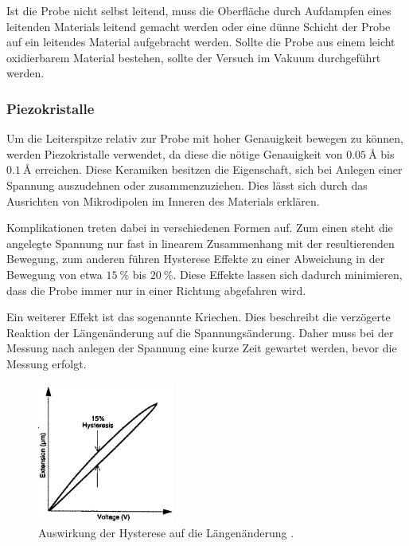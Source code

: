 Ist die Probe nicht selbst leitend, muss die Oberfläche durch Aufdampfen eines leitenden Materials leitend gemacht werden oder eine dünne Schicht der Probe auf ein leitendes Material aufgebracht werden.
Sollte die Probe aus einem leicht oxidierbarem Material bestehen, sollte der Versuch im Vakuum durchgeführt werden.

\subsubsection{Piezokristalle} %
\label{ssub:piezokristalle}

Um die Leiterspitze relativ zur Probe mit hoher Genauigkeit bewegen zu können, werden Piezokristalle verwendet, da diese die nötige Genauigkeit von $\SI{0,05}{\angstrom}$ bis $\SI{0,1}{\angstrom}$ erreichen.
Diese Keramiken besitzen die Eigenschaft, sich bei Anlegen einer Spannung auszudehnen oder zusammenzuziehen.
Dies lässt sich durch das Ausrichten von Mikrodipolen im Inneren des Materials erklären.

Komplikationen treten dabei in verschiedenen Formen auf.
Zum einen steht die angelegte Spannung nur fast in linearem Zusammenhang mit der resultierenden Bewegung, zum anderen führen Hysterese Effekte zu einer Abweichung in der Bewegung von etwa $\SI{15}{\percent}$ bis $\SI{20}{\percent}$.
Diese Effekte lassen sich dadurch minimieren, dass die Probe immer nur in einer Richtung abgefahren wird.

Ein weiterer Effekt ist das sogenannte Kriechen.
Dies beschreibt die verzögerte Reaktion der Längenänderung auf die Spannungsänderung.
Daher muss bei der Messung nach anlegen der Spannung eine kurze Zeit gewartet werden, bevor die Messung erfolgt.

\begin{figure}[!h]
    \centering
    \includegraphics[width=0.4\textwidth]{images/hysterese.JPG}
    \caption{Auswirkung der Hysterese auf die Längenänderung \cite{STM-Literatur}.}
\end{figure}

